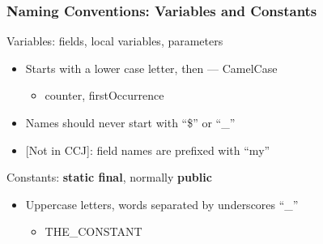 \documentclass[screen]{beamer}
\begin{document}
\begin{frame}[fragile]
\frametitle{Naming Conventions: Variables and Constants}%
%
\begin{block}{Variables: fields, local variables, parameters}
	\begin{itemize}
		\item Starts with a lower case letter, then --- CamelCase
			\begin{itemize}
				\item counter, firstOccurrence
			\end{itemize}
		\item Names should never start with ``\$'' or ``\_''
		\item{} [Not in CCJ]: field names are prefixed with ``my''
	\end{itemize}
\end{block}
\begin{block}{Constants: {\bf static final}, normally {\bf public}}
	\begin{itemize}
		\item Uppercase letters, words separated by underscores ``\_''
			\begin{itemize}
				\item THE\_CONSTANT
			\end{itemize}
	\end{itemize}
\end{block}
\end{frame}
\end{document}
